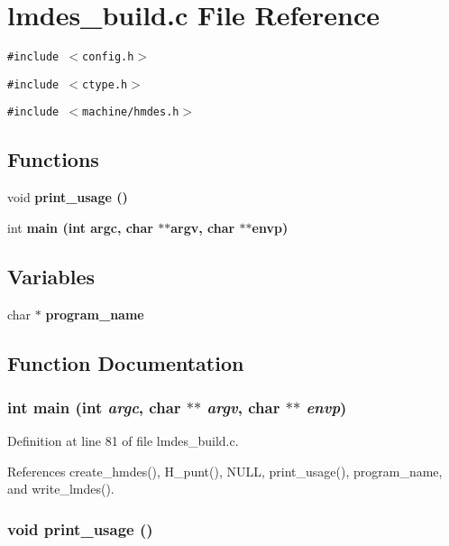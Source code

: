 \section{lmdes\_\-build.c File Reference}
\label{lmdes__build_8c}
{\tt \#include $<$config.h$>$}\par
{\tt \#include $<$ctype.h$>$}\par
{\tt \#include $<$machine/hmdes.h$>$}\par
\subsection*{Functions}
\begin{CompactItemize}
\item 
void \bf{print\_\-usage} ()
\item 
int \bf{main} (int argc, char $\ast$$\ast$argv, char $\ast$$\ast$envp)
\end{CompactItemize}
\subsection*{Variables}
\begin{CompactItemize}
\item 
char $\ast$ \bf{program\_\-name}
\end{CompactItemize}


\subsection{Function Documentation}
\subsubsection{\setlength{\rightskip}{0pt plus 5cm}int main (int {\em argc}, char $\ast$$\ast$ {\em argv}, char $\ast$$\ast$ {\em envp})}\label{lmdes__build_8c_647f21a28344e1d9c643f4115516d7c9}




Definition at line 81 of file lmdes\_\-build.c.

References create\_\-hmdes(), H\_\-punt(), NULL, print\_\-usage(), program\_\-name, and write\_\-lmdes().
\subsubsection{\setlength{\rightskip}{0pt plus 5cm}void print\_\-usage ()}\label{lmdes__build_8c_e5ad5cbeccaedc03a48d3c7eaa803e79}




